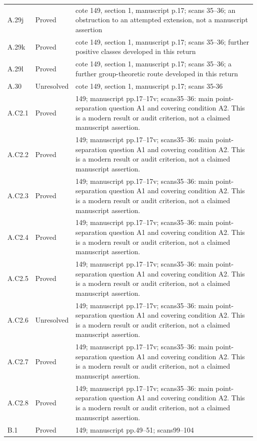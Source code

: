 {\begin{longtable}{p{1.9cm}p{1.7cm}p{10.3cm}}
A.29j & Proved & cote 149, section 1, manuscript p.17; scans 35–36; an obstruction to an attempted extension, not a manuscript assertion \\
A.29k & Proved & cote 149, section 1, manuscript p.17; scans 35–36; further positive classes developed in this return \\
A.29l & Proved & cote 149, section 1, manuscript p.17; scans 35–36; a further group-theoretic route developed in this return \\
A.30 & Unresolved & cote 149, section 1, manuscript p.17; scans 35-36 \\
A.C2.1 & Proved & 149; manuscript pp.17–17v; scans35–36: main point-separation question A1 and covering condition A2. This is a modern result or audit criterion, not a claimed manuscript assertion. \\
A.C2.2 & Proved & 149; manuscript pp.17–17v; scans35–36: main point-separation question A1 and covering condition A2. This is a modern result or audit criterion, not a claimed manuscript assertion. \\
A.C2.3 & Proved & 149; manuscript pp.17–17v; scans35–36: main point-separation question A1 and covering condition A2. This is a modern result or audit criterion, not a claimed manuscript assertion. \\
A.C2.4 & Proved & 149; manuscript pp.17–17v; scans35–36: main point-separation question A1 and covering condition A2. This is a modern result or audit criterion, not a claimed manuscript assertion. \\
A.C2.5 & Proved & 149; manuscript pp.17–17v; scans35–36: main point-separation question A1 and covering condition A2. This is a modern result or audit criterion, not a claimed manuscript assertion. \\
A.C2.6 & Unresolved & 149; manuscript pp.17–17v; scans35–36: main point-separation question A1 and covering condition A2. This is a modern result or audit criterion, not a claimed manuscript assertion. \\
A.C2.7 & Proved & 149; manuscript pp.17–17v; scans35–36: main point-separation question A1 and covering condition A2. This is a modern result or audit criterion, not a claimed manuscript assertion. \\
A.C2.8 & Proved & 149; manuscript pp.17–17v; scans35–36: main point-separation question A1 and covering condition A2. This is a modern result or audit criterion, not a claimed manuscript assertion. \\
B.1 & Proved & 149; manuscript pp.49–51; scans99–104 \\

\end{longtable}}
